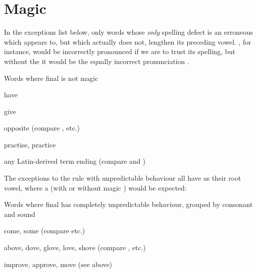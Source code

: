 \section{Magic }

In the exceptions list below, only words whose \emph{only} spelling defect is an
erroneous  which appears to, but which actually does not, lengthen its
preceding vowel. , for instance, would be incorrectly pronounced
 if we are to trust its spelling, but without the  it would be
the equally incorrect pronunciation .

\begin{exceptions}{Words where final  is not magic}
\item have
\item give
\item opposite (compare , etc.)
\item practise, practice
\item 
\item any Latin-derived term ending  (compare  and )
\end{exceptions}

The exceptions to the rule with unpredictable behaviour all have  as their
root vowel, where a  (with or without magic ) would be expected:

\begin{exceptions}{Words where final  has completely unpredictable behaviour, grouped by consonant and sound}
\item come, some (compare  etc.)
\item above, dove, glove, love, shove (compare , etc.)
\item improve, approve, move (see above)
\end{exceptions}

